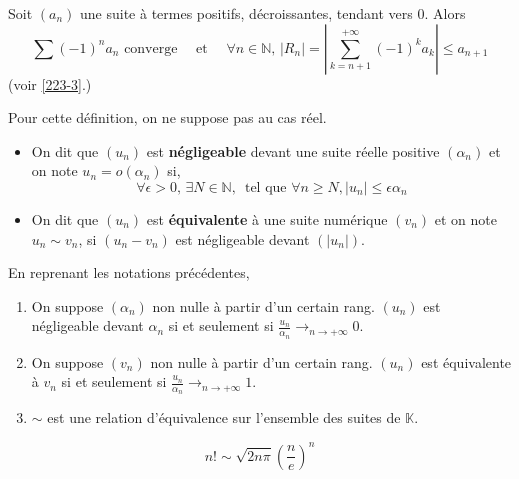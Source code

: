 
  \begin{application}
    Soit $(a_n)$ une suite à termes positifs, décroissantes, tendant vers $0$. Alors
    \[ \sum (-1)^n a_n \text{ converge} \quad \text{ et } \quad \forall n \in \mathbb{N}, \, |R_n| = \left| \sum_{k=n+1}^{+\infty} (-1)^k a_k \right| \leq a_{n+1} \]
    (voir \cref{223-3}.)
  \end{application}


  \begin{definition}
    Pour cette définition, on ne suppose pas au cas réel.
    \begin{itemize}
      \item On dit que $(u_n)$ est \textbf{négligeable} devant une suite réelle positive $(\alpha_n)$ et on note $u_n = o(\alpha_n)$ si,
      \[ \forall \epsilon > 0, \, \exists N \in \mathbb{N}, \, \text{ tel que } \forall n \geq N, \vert u_n \vert \leq \epsilon \alpha_n  \]
      \item On dit que $(u_n)$ est \textbf{équivalente} à une suite numérique $(v_n)$ et on note $u_n \sim v_n$, si $(u_n - v_n)$ est négligeable devant $(\vert u_n \vert)$.
    \end{itemize}
  \end{definition}

  \begin{proposition}
    En reprenant les notations précédentes,
    \begin{enumerate}[label=(\roman*)]
      \item On suppose $(\alpha_n)$ non nulle à partir d'un certain rang. $(u_n)$ est négligeable devant $\alpha_n$ si et seulement si $\frac{u_n}{\alpha_n} \longrightarrow_{n \rightarrow +\infty} 0$.
      \item On suppose $(v_n)$ non nulle à partir d'un certain rang. $(u_n)$ est équivalente à $v_n$ si et seulement si $\frac{u_n}{\alpha_n} \longrightarrow_{n \rightarrow +\infty} 1$.
      \item $\sim$ est une relation d'équivalence sur l'ensemble des suites de $\mathbb{K}$.
    \end{enumerate}
  \end{proposition}


  \begin{example}
    \[ n! \sim \sqrt{2n\pi} \left( \frac{n}{e} \right)^n \]
  \end{example}

